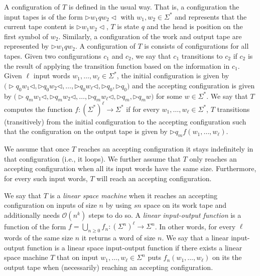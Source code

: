 A configuration of $T$ is defined in the usual way. That is, a configuration the input tapes is of the form
$\rhd w_1qw_2\lhd$ with $w_1,w_2\in\Sigma^*$ and represents that the current tape content is $\rhd w_1w_2\lhd$, $T$ is state $q$ and the head is position on the first symbol of $w_2$. Similarly, a configuration of the work and output tape are represented by $\rhd w_1qw_2$. A configuration of $T$ is consists of configurations for all tapes. Given two configurations $c_1$ and $c_2$, we say that $c_1$
transitions to $c_2$ if $c_2$ is the result of applying the transition function based on the information in $c_1$. Given $\ell$ input words $w_1,\ldots,w_\ell\in\Sigma^*$, the initial configuration is given by
 $\bigl(\rhd q_0 w_1\lhd,\rhd q_0 w_2\lhd,\ldots, \rhd q_0 w_\ell\lhd,\rhd q_0,\rhd q_0\bigr)$ and the accepting configuration is given by $\bigl(\rhd q_m w_1\lhd,\rhd q_m w_2\lhd,\ldots, \rhd q_m w_\ell\lhd,\rhd q_m,\rhd q_m w\bigr)$ for some $w\in\Sigma^*$. We say that $T$ computes the function $f:(\Sigma^*)^{\ell}\to\Sigma^*$ if for every $w_1,\ldots,w_\ell\in\Sigma^*$, $T$ transitions (transitively) from the initial configuration to the accepting configuration such that the configuration on the output tape is
 given by $\rhd q_m f(w_1,\ldots,w_\ell)$.

We assume that once $T$ reaches an accepting configuration it stays indefinitely in that configuration (i.e., it loops). We further assume that $T$ only reaches an accepting configuration when all its input
words have the same size. Furthermore, for every such input words, $T$ will reach an accepting configuration.


We say that $T$ is a \textit{linear space machine} when it reaches an accepting configuration 
on inputs of size $n$ by using $sn$ space on its work tape and additionally needs  $\mathcal{O}(n^k)$ steps to do so. A \textit{linear input-output function} is a function of the form $f=\bigcup_{n\geq 0} f_n:(\Sigma^n)^\ell\to\Sigma^n$. In other words, for every $\ell$ words of the same size $n$ it returns a word of size $n$. We say that a linear input-output function is a linear space input-output function if
there exists a linear space machine  $T$ that on input $w_1,\ldots,w_\ell\in\Sigma^n$ puts
$f_n(w_1,\ldots,w_\ell)$ on its the output tape when (necessarily) reaching an accepting configuration.

